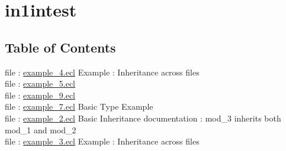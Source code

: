 \chapter*{in1intest}
\hypertarget{ecldoc:toc:intest/in1intest}{}


\section*{Table of Contents}
file : \hyperlink{ecldoc:toc:intest.in1intest.example_4}{example\_4.ecl}  Example : Inheritance across files \\
file : \hyperlink{ecldoc:toc:intest.in1intest.example_5}{example\_5.ecl}   \\
file : \hyperlink{ecldoc:toc:intest.in1intest.example_9}{example\_9.ecl}   \\
file : \hyperlink{ecldoc:toc:intest.in1intest.example_7}{example\_7.ecl}  Basic Type Example \\
file : \hyperlink{ecldoc:toc:intest.in1intest.example_2}{example\_2.ecl}  Basic Inheritance documentation : mod\_3 inherits both mod\_1 and mod\_2 \\
file : \hyperlink{ecldoc:toc:intest.in1intest.example_3}{example\_3.ecl}  Example : Inheritance across files \\







